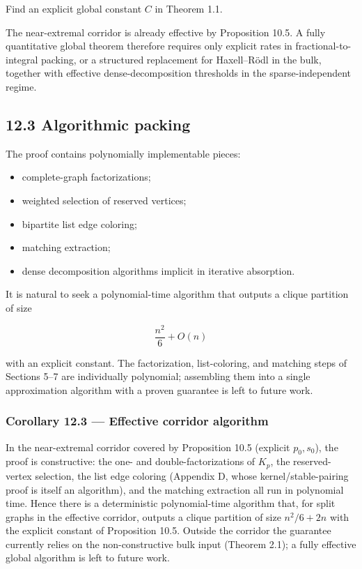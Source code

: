 \documentclass[
  11pt,
]{article}
\providecommand{\tightlist}{%
  \setlength{\itemsep}{0pt}\setlength{\parskip}{0pt}}
\begin{document}
Find an explicit global constant \(C\) in Theorem 1.1.

The near-extremal corridor is already effective by Proposition 10.5. A fully quantitative global theorem therefore requires only explicit rates in fractional-to-integral packing, or a structured replacement for Haxell--Rödl in the bulk, together with effective dense-decomposition thresholds in the sparse-independent regime.

\subsection{12.3 Algorithmic packing}\label{algorithmic-packing}

The proof contains polynomially implementable pieces:

\begin{itemize}
\tightlist
\item
  complete-graph factorizations;
\item
  weighted selection of reserved vertices;
\item
  bipartite list edge coloring;
\item
  matching extraction;
\item
  dense decomposition algorithms implicit in iterative absorption.
\end{itemize}

It is natural to seek a polynomial-time algorithm that outputs a clique partition of size

\[
\frac{n^2}{6}+O(n)
\]

with an explicit constant. The factorization, list-coloring, and matching steps of Sections 5--7 are individually polynomial; assembling them into a single approximation algorithm with a proven guarantee is left to future work.

\subsubsection{Corollary 12.3 --- Effective corridor algorithm}\label{corollary-12.3-effective-corridor-algorithm}

In the near-extremal corridor covered by Proposition 10.5 (explicit \(p_0,s_0\)), the proof is
constructive: the one- and double-factorizations of \(K_p\), the reserved-vertex selection, the
list edge coloring (Appendix D, whose kernel/stable-pairing proof is itself an algorithm), and
the matching extraction all run in polynomial time. Hence there is a deterministic
polynomial-time algorithm that, for split graphs in the effective corridor, outputs a clique
partition of size \(n^2/6+2n\) with the explicit constant of Proposition 10.5. Outside the
corridor the guarantee currently relies on the non-constructive bulk input (Theorem 2.1); a
fully effective global algorithm is left to future work.
\end{document}
